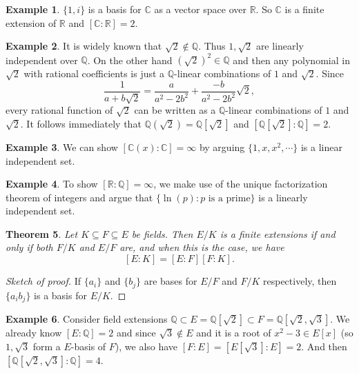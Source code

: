 \documentclass[12pt]{report}
\newtheorem{thm}{Theorem}[section]
\theoremstyle{definition}
\newtheorem{example}[thm]{Example}
\def\CC{\mathbb{C}}
\def\QQ{\mathbb{Q}}
\def\RR{\mathbb{R}}
\begin{document}
\begin{example}
    $\{1,i\}$ is a basis for $\CC$ as a vector space over $\RR$. So $\CC$ is a finite extension of $\RR$ and $[\CC:\RR]=2$. 
\end{example}

\begin{example}
    It is widely known that $\sqrt{2}\notin\QQ$. Thus $1,\sqrt{2}$ are linearly independent over $\QQ$. On the other hand $(\sqrt{2})^2\in \QQ$ and then any polynomial in $\sqrt{2}$ with rational coefficients is just a $\QQ$-linear combinations of $1$ and $\sqrt{2}$. Since $$\frac{1}{a+b\sqrt{2}} = \frac{a}{a^2-2b^2} +\frac{-b}{a^2-2b^2}\sqrt{2},$$ every rational function of $\sqrt{2}$ can be written as a $\QQ$-linear combinations of $1$ and $\sqrt{2}$. It follows immediately that $\QQ(\sqrt{2})=\QQ[\sqrt{2}]$ and $[\QQ[\sqrt{2}]:\QQ]=2$.  
\end{example}

\begin{example}
    We can show $[\CC(x):\CC]=\infty$ by arguing $\{1,x,x^2,\cdots\}$ is a linear independent set.
\end{example}

\begin{example}
    To show $[\RR:\QQ]=\infty$, we make use of the unique factorization theorem of integers and argue that $\{\ln(p): p \mbox{ is a prime}\}$ is a linearly independent set.
\end{example}

\begin{thm}
    Let $K\subseteq F\subseteq E$ be fields. Then $E/K$ is a finite extensions if and only if both $F/K$ and $E/F$  are, and when this is the case, we have $$[E:K]=[E:F][F:K].$$
\end{thm}

\begin{proof}[Sketch of proof]
    If $\{a_i\}$ and $\{b_j\}$ are bases for $E/F$ and $F/K$ respectively, then $\{a_ib_j\}$ is a basis for $E/K$.
\end{proof}

\begin{example}
    Consider field extensions $\QQ\subset E= \QQ[\sqrt{2}]\subset F=\QQ[\sqrt{2},\sqrt{3}]$. We already know $[E:\QQ]=2$ and since $\sqrt{3}\notin E$ and it is a root of $x^2-3\in E[x]$ (so $1,\sqrt{3}$ form a $E$-basis of $F$), we also have $[F:E]=[E[\sqrt{3}]:E]=2$. And then $[\QQ[\sqrt{2},\sqrt{3}]:\QQ]=4$.
\end{example}
\end{document}
